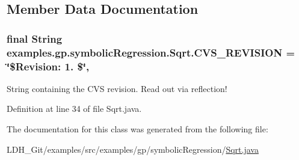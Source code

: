 \subsection{Member Data Documentation}
\hypertarget{classexamples_1_1gp_1_1symbolic_regression_1_1_sqrt_a04c1016ca939501ebc37c72d608ea008}{
\subsubsection[{C\-V\-S\-\_\-\-R\-E\-V\-I\-S\-I\-O\-N}]{\setlength{\rightskip}{0pt plus 5cm}final String examples.\-gp.\-symbolic\-Regression.\-Sqrt.\-C\-V\-S\-\_\-\-R\-E\-V\-I\-S\-I\-O\-N = \char`\"{}\$Revision\-: 1. \$\char`\"{}\hspace{0.3cm}{\ttfamily [static]}, {\ttfamily [private]}}}\label{classexamples_1_1gp_1_1symbolic_regression_1_1_sqrt_a04c1016ca939501ebc37c72d608ea008}
String containing the C\-V\-S revision. Read out via reflection! 

Definition at line 34 of file Sqrt.\-java.



The documentation for this class was generated from the following file\-:\begin{DoxyCompactItemize}
\item 
L\-D\-H\-\_\-\-Git/examples/src/examples/gp/symbolic\-Regression/\hyperlink{_sqrt_8java}{Sqrt.\-java}\end{DoxyCompactItemize}
